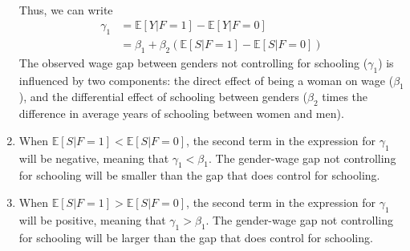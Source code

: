 \documentclass[10pt]{article}
\newcommand{\E}{\mathbb{E}}
\newenvironment{problem}[2][Problem]{\begin{trivlist}
\item[\hskip \labelsep {\bfseries #1}\hskip \labelsep {\bfseries #2.}]}{\end{trivlist}}
\begin{document}
\begin{problem}{4}
\begin{enumerate}[label=(\alph*)]
\begin{align*}
            \end{align*}
            Thus, we can write
            \begin{align*}
                \gamma_1 &= \E[Y | F = 1] - \E[Y | F = 0] \\
                         &= \beta_1 + \beta_2 (\E[S | F = 1] - \E[S | F = 0])
            \end{align*}
            The observed wage gap between genders not controlling for schooling ($\gamma_1$) is influenced by two components: the direct effect of being a woman on wage ($\beta_1$), and the differential effect of schooling between genders ($\beta_2$ times the difference in average years of schooling between women and men).
        \item 
            When $\E[S | F = 1] < \E[S | F = 0]$, the second term in the expression for $\gamma_1$ will be negative, meaning that $\gamma_1 < \beta_1$.
            The gender-wage gap not controlling for schooling will be smaller than the gap that does control for schooling.
        \item
            When $\E[S | F = 1] > \E[S | F = 0]$, the second term in the expression for $\gamma_1$ will be positive, meaning that $\gamma_1 > \beta_1$.
            The gender-wage gap not controlling for schooling will be larger than the gap that does control for schooling.
    \end{enumerate}
\end{problem}
\end{document}
